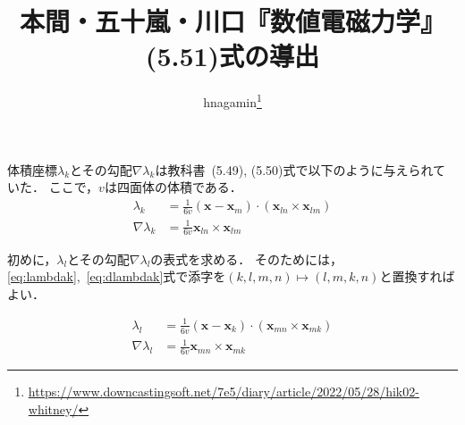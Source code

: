 \documentclass{jlreq}
\title{本間・五十嵐・川口『数値電磁力学』 (5.51)式の導出}
\author{hnagamin\thanks{\url{https://www.downcastingsoft.net/7e5/diary/article/2022/05/28/hik02-whitney/}}}
\begin{document}
\maketitle

体積座標\(\lambda_k\)とその勾配\(\nabla\lambda_k\)は教科書~(5.49), (5.50)式で以下のように与えられていた\cite[p. 159]{Homma2002}．
ここで，\(v\)は四面体の体積である．
\begin{align}
  \lambda_k
  &= \frac{1}{6v}(\bm{x}-\bm{x}_m)\cdot(\bm{x}_{l n}\times\bm{x}_{lm})
  \label{eq:lambdak} \\
  \nabla \lambda_k
  &= \frac{1}{6v}\bm{x}_{l n}\times\bm{x}_{lm}
  \label{eq:dlambdak}
\end{align}

初めに，\(\lambda_l\)とその勾配\(\nabla\lambda_l\)の表式を求める．
そのためには，\eqref{eq:lambdak},~\eqref{eq:dlambdak}式で添字を\(
  (k,l,m,n)\mapsto(l,m,k,n)
\)と置換すればよい．

\begin{align}
  \lambda_l
  &= \frac{1}{6v}(\bm{x}-\bm{x}_k)\cdot(\bm{x}_{mn}\times\bm{x}_{mk})
  \label{eq:lambdal} \\
  \nabla\lambda_l
  &= \frac{1}{6v}\bm{x}_{mn}\times\bm{x}_{mk}
  \label{eq:dlambdal}
\end{align}
\end{document}
